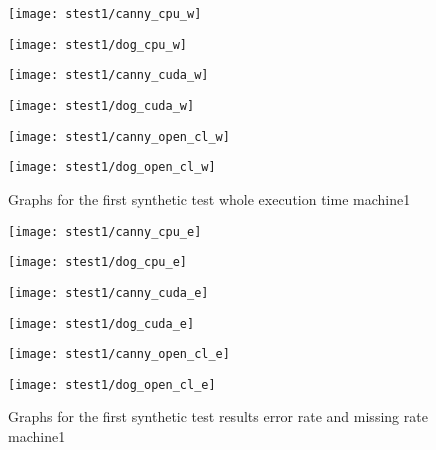\begin{figure}[H]
\centering
\begin{minipage}[t]{.49\textwidth}
\centering
\texttt{[image: stest1/canny\_cpu\_w]}
\end{minipage}
\begin{minipage}[t]{.49\textwidth}
\centering
\texttt{[image: stest1/dog\_cpu\_w]}
\end{minipage}
\begin{minipage}[t]{.49\textwidth}
\centering
\texttt{[image: stest1/canny\_cuda\_w]}
\end{minipage}
\begin{minipage}[t]{.49\textwidth}
\centering
\texttt{[image: stest1/dog\_cuda\_w]}
\end{minipage}
\begin{minipage}[t]{.49\textwidth}
\centering
\texttt{[image: stest1/canny\_open\_cl\_w]}
\end{minipage}
\begin{minipage}[t]{.49\textwidth}
\centering
\texttt{[image: stest1/dog\_open\_cl\_w]}
\end{minipage}
\caption{Graphs for the first synthetic test whole execution time machine1}
\label{fig:test1sw}
\end{figure}

\begin{figure}[H]
\centering
\begin{minipage}[t]{.49\textwidth}
\centering
\texttt{[image: stest1/canny\_cpu\_e]}
\end{minipage}
\begin{minipage}[t]{.49\textwidth}
\centering
\texttt{[image: stest1/dog\_cpu\_e]}
\end{minipage}
\begin{minipage}[t]{.49\textwidth}
\centering
\texttt{[image: stest1/canny\_cuda\_e]}
\end{minipage}
\begin{minipage}[t]{.49\textwidth}
\centering
\texttt{[image: stest1/dog\_cuda\_e]}
\end{minipage}
\begin{minipage}[t]{.49\textwidth}
\centering
\texttt{[image: stest1/canny\_open\_cl\_e]}
\end{minipage}
\begin{minipage}[t]{.49\textwidth}
\centering
\texttt{[image: stest1/dog\_open\_cl\_e]}
\end{minipage}
\caption{Graphs for the first synthetic test results error rate and missing rate machine1}
\label{fig:test1se}
\end{figure}

